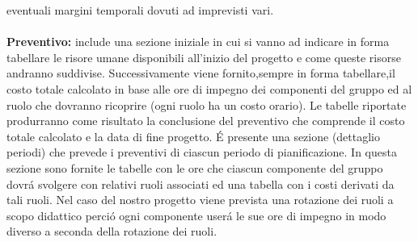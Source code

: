eventuali margini temporali dovuti ad imprevisti vari.
\\\\
\textbf{Preventivo:} include una sezione iniziale in cui si vanno ad indicare in forma tabellare le risore umane disponibili all'inizio del progetto e 
come queste risorse andranno suddivise. Successivamente viene fornito,sempre in forma tabellare,il costo totale calcolato in base alle ore 
di impegno dei componenti del gruppo ed al ruolo che dovranno ricoprire (ogni ruolo ha un costo orario).
Le tabelle riportate produrranno come risultato la conclusione del preventivo che comprende il costo totale calcolato e la data di fine progetto.
É presente una sezione (dettaglio periodi) che prevede i preventivi di ciascun periodo di pianificazione.
In questa sezione sono fornite le tabelle con le ore che ciascun componente del gruppo dovrá svolgere con relativi ruoli associati ed una tabella con i costi
derivati da tali ruoli.
Nel caso del nostro progetto viene prevista una rotazione dei ruoli a scopo didattico perció ogni componente userá le sue ore di impegno in modo diverso 
a seconda della rotazione dei ruoli.